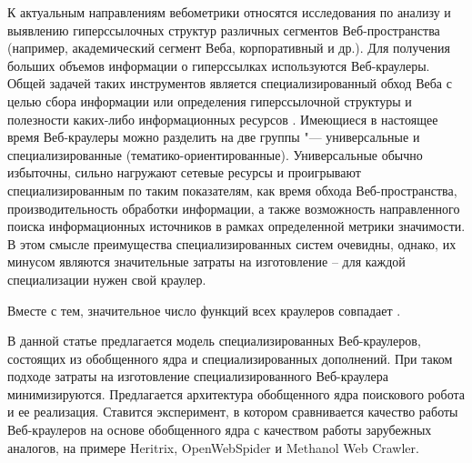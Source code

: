 К актуальным направлениям вебометрики относятся исследования по анализу и выявлению гиперссылочных структур различных сегментов Веб-пространства (например, академический сегмент Веба, корпоративный и др.). Для получения больших объемов информации о гиперссылках используются Веб-краулеры. Общей задачей таких инструментов является специализированный обход Веба с целью сбора информации или определения гиперссылочной структуры и полезности каких-либо информационных ресурсов \cite{BlekanovBondarenko1,BlekanovBondarenko2}. Имеющиеся в настоящее время Веб-краулеры можно разделить на две группы "--- универсальные и специализированные (тематико-ориентированные). Универсальные обычно избыточны, сильно нагружают сетевые ресурсы и проигрывают специализированным по таким показателям, как время обхода Веб-пространства, производительность обработки информации, а также возможность направленного поиска информационных источников в рамках определенной метрики значимости. В этом смысле преимущества специализированных систем очевидны, однако, их минусом являются значительные затраты на изготовление -- для каждой специализации нужен свой краулер.

Вместе с тем, значительное число функций всех краулеров совпадает \cite{ArasuChoGM,Bar-Ilan,ChoGM,NajorkHeydon}.

В данной статье предлагается модель специализированных Веб-краулеров, состоящих из обобщенного ядра и специализированных дополнений. При таком подходе затраты на изготовление специализированного Веб-краулера минимизируются. Предлагается архитектура обобщенного ядра поискового робота и ее реализация. Ставится эксперимент, в котором сравнивается качество работы Веб-краулеров на основе обобщенного ядра с качеством работы зарубежных аналогов, на примере Heritrix, OpenWebSpider и Methanol Web Crawler.

